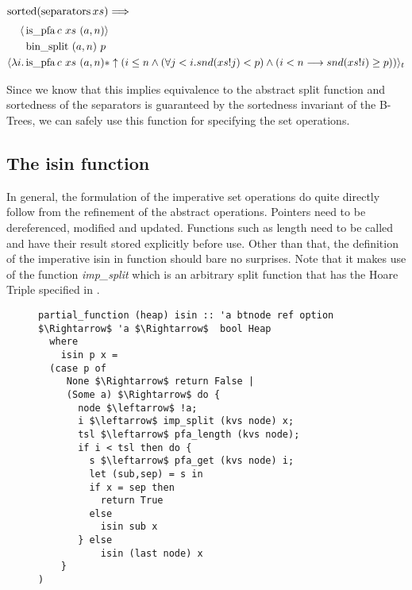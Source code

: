 \begin{lemma} $\operatorname{sorted} (\operatorname{separators} xs) \Longrightarrow$ \\
    \begin{align*}
        \langle &\operatorname{is\_pfa} c\ xs\ (a,n)\rangle \\
                  &\operatorname{bin\_split}\ (a,n)\ p \\
        \langle \lambda i. & \operatorname{is\_pfa} c\ xs\ (a,n)
        * \uparrow(i \leq n 
            \wedge (\forall j < i. snd (xs!j) < p) 
            \wedge (i<n \longrightarrow snd (xs!i) \geq p)) \rangle_t 
    \end{align*}
\end{lemma}

Since we know that this implies equivalence to the abstract split function
and sortedness of the separators is guaranteed by the sortedness
invariant of the B-Trees,
we can safely use this function for specifying
the set operations.


\subsection{The isin function}

In general, the formulation of the imperative set operations
do quite directly follow
from the refinement of the abstract operations.
Pointers need to be dereferenced, modified and updated.
Functions such as length need to be called and have their result
stored explicitly before use.
Other than that, the definition of the imperative isin in 
function should bare no surprises.
Note that it makes use of the function \textit{imp\_split}
which is an arbitrary split function that has the Hoare Triple
specified in .

\begin{figure}
\begin{lstlisting}[mathescape=true, language=Isabelle, label={lst:imp-isin-fun},
    caption={The imperative isin function}]
partial_function (heap) isin :: 'a btnode ref option $\Rightarrow$ 'a $\Rightarrow$  bool Heap
  where
    isin p x =
  (case p of
     None $\Rightarrow$ return False |
     (Some a) $\Rightarrow$ do {
       node $\leftarrow$ !a;
       i $\leftarrow$ imp_split (kvs node) x;
       tsl $\leftarrow$ pfa_length (kvs node);
       if i < tsl then do {
         s $\leftarrow$ pfa_get (kvs node) i;
         let (sub,sep) = s in
         if x = sep then
           return True
         else
           isin sub x
       } else
           isin (last node) x
    }
)
\end{lstlisting}
\end{figure}


